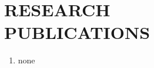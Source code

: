 \documentclass[margin]{res}
\begin{document}
    \section{RESEARCH \\ PUBLICATIONS}
    \begin{enumerate}
        \item none\\
    \end{enumerate}
  
\(\)
\end{document}
